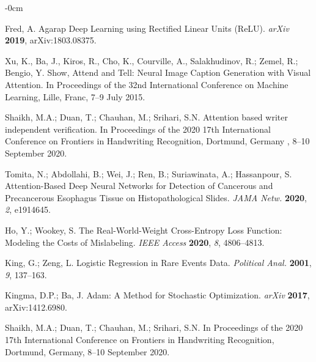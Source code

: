 \documentclass[sensors,article,accept,pdftex,moreauthors]{Definitions/mdpi}
\begin{document}
\begin{adjustwidth}{-\extralength}{0cm}
\begin{thebibliography}{999}
Fred, A. Agarap Deep Learning using Rectified Linear Units (ReLU).
{\em arXiv} 
{\bf 2019}, arXiv:1803.08375.

Xu, K., Ba, J., Kiros, R., Cho, K., Courville, A., Salakhudinov, R.; Zemel, R.; Bengio, Y. Show, Attend and Tell: Neural Image Caption Generation with Visual Attention. In Proceedings of the 32nd International Conference on Machine Learning, Lille, Franc, 7--9 July 2015.

Shaikh, M.A.; Duan, T.; Chauhan, M.; Srihari, S.N. {Attention} %
 based writer independent verification. In Proceedings of the 2020 17th International Conference on Frontiers in Handwriting Recognition,  Dortmund, Germany , 8--10 September
{2020}.

Tomita, N.; Abdollahi, B.; Wei, J.; Ren, B.; Suriawinata, A.; Hassanpour, S. Attention-Based Deep Neural Networks for Detection of Cancerous and Precancerous Esophagus Tissue on Histopathological Slides.
{\em JAMA Netw.} 
{\bf 2020}, \emph{2}, e1914645.

Ho, Y.; Wookey, S. The Real-World-Weight Cross-Entropy Loss Function: Modeling the Costs of Mislabeling.
\emph{IEEE Access }
{\bf 2020}, \emph{8}, 4806--4813.

King, G.; Zeng, L. Logistic Regression in Rare Events Data.
{\em Political Anal.} 
{\bf 2001}, \emph{9}, 137--163.

Kingma, D.P.; Ba, J. Adam: A Method for Stochastic Optimization.
{\em arXiv} 
{\bf 2017}, arXiv:1412.6980.

{Shaikh, M.A.;} %
 Duan, T.; Chauhan, M.; Srihari, S.N. {In} %
 Proceedings of the 2020 17th International Conference on Frontiers in Handwriting Recognition, Dortmund, Germany, 8--10 September 2020.




		\end{thebibliography}
		

\end{adjustwidth}
\end{document}

